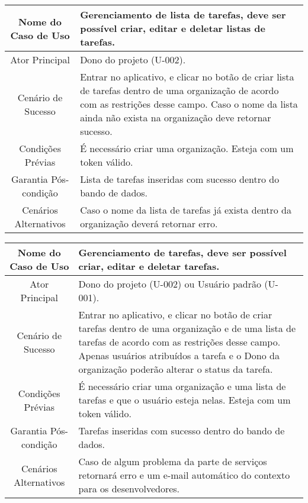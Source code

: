 \vspace{1cm}

\begin{tabularx}{\textwidth}{|c|X|}
    \hline
    Nome do Caso de Uso & Gerenciamento de lista de tarefas, deve ser possível criar, editar e deletar listas de tarefas. \\ \hline
    Ator Principal & Dono do projeto (U-002). \\ \hline
    Cenário de Sucesso & Entrar no aplicativo, e clicar no botão de criar lista de tarefas dentro de uma organização de acordo com as restrições desse campo. Caso o nome da lista ainda não exista na organização deve retornar sucesso. \\ \hline
    Condições Prévias & É necessário criar uma organização. Esteja com um \gls{token} válido. \\ \hline
    Garantia Pós-condição & Lista de tarefas inseridas com sucesso dentro do bando de dados. \\ \hline
    Cenários Alternativos & Caso o nome da lista de tarefas já exista dentro da organização deverá retornar erro.  \\ \hline
\end{tabularx}

\vspace{1cm}
    
\begin{tabularx}{\textwidth}{|c|X|}
    \hline
    Nome do Caso de Uso & Gerenciamento de tarefas, deve ser possível criar, editar e deletar tarefas. \\ \hline
    Ator Principal & Dono do projeto (U-002) ou Usuário padrão (U-001). \\ \hline
    Cenário de Sucesso & Entrar no aplicativo, e clicar no botão de criar tarefas dentro de uma organização e de uma lista de tarefas de acordo com as restrições desse campo. Apenas usuários atribuídos a tarefa e o Dono da organização poderão alterar o status da tarefa. \\ \hline
    Condições Prévias & É necessário criar uma organização e uma lista de tarefas e que o usuário esteja nelas. Esteja com um \gls{token} válido. \\ \hline
    Garantia Pós-condição & Tarefas inseridas com sucesso dentro do bando de dados. \\ \hline
    Cenários Alternativos & Caso de algum problema da parte de serviços retornará erro e um e-mail automático do contexto para os desenvolvedores.  \\ \hline
\end{tabularx}

\vspace{1cm}
